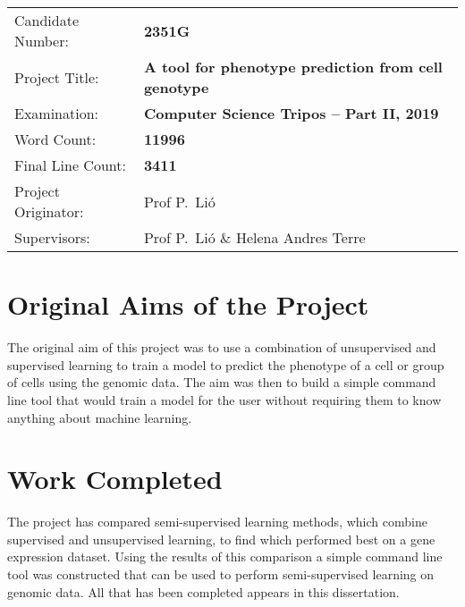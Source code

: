 \documentclass[12pt,a4paper,twoside,openany]{report}
\begin{document}
{\large
\begin{tabular}{ll}
Candidate Number:   & \bf 2351G                   \\
Project Title:      & \bf A tool for phenotype prediction from cell genotype  \\
Examination:        & \bf Computer Science Tripos -- Part II, 2019  \\
Word Count:         & \bf 11996\footnotemark[1]  \\
Final Line Count:   & \bf 3411\\
Project Originator: & Prof P.~Li\'o                   \\
Supervisors:         & Prof P.~Li\'o \& Helena Andres Terre                   \\ 
\end{tabular}
}


\section*{Original Aims of the Project}

The original aim of this project was to use a combination of unsupervised and supervised learning 
to train a model to predict the phenotype of a cell or group of cells using the genomic data.
The aim was then to build a simple command line tool that would train a model for the user without requiring them 
to know anything about machine learning.

\section*{Work Completed}

The project has compared semi-supervised learning methods, which combine supervised and unsupervised learning,
to find which performed best on a gene expression dataset. Using the results of this comparison
a simple command line tool was constructed that can be used to perform semi-supervised learning on genomic data.
All that has been completed appears in this dissertation.

\tableofcontents

\listoffigures


\pagestyle{headings}











\printbibliography


\end{document}
